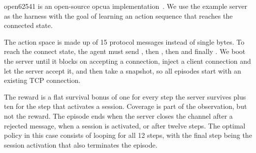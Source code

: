 open62541 is an open-source \gls{opcua} implementation~\cite{open62541_open62541_nodate}.
We use the  example server as the harness
with the goal of learning an action sequence that reaches the connected state.

The action space is made up of 15 protocol messages instead of single bytes.
To reach the connect state, the agent must send , then ,
then  and finally .
We boot the server until it blocks on accepting a connection, inject a client connection and let the
server accept it, and then take a snapshot, so all episodes start with an existing TCP connection.

The reward is a flat survival bonus of one for every step the server survives plus ten for the step
that activates a session.
Coverage is part of the observation, but not the reward.
The episode ends when the server closes the channel after a rejected message,
when a session is activated, or after twelve steps.
The optimal policy in this case consists of looping for all 12 steps, with the
final step being the session activation that also terminates the episode.
